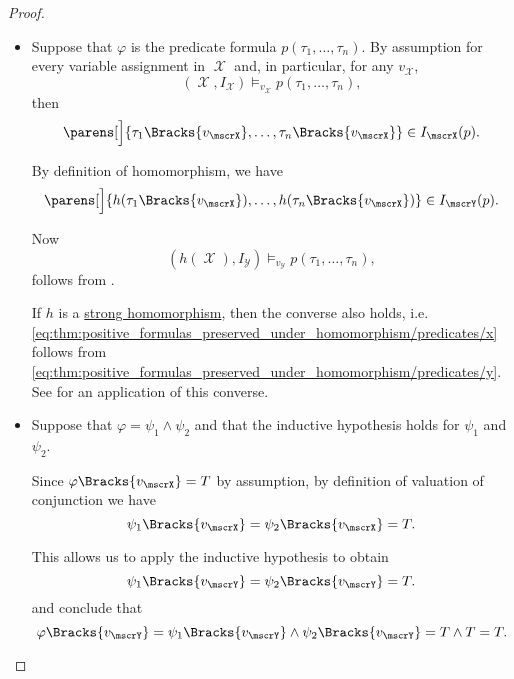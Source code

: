 \begin{proof}
\begin{itemize}
    \item Suppose that \( \varphi \) is the predicate formula \( p(\tau_1, \ldots, \tau_n) \). By assumption for every variable assignment in \( \mscrX \) and, in particular, for any \( v_\mscrX \),
    \begin{equation*}
      (\mscrX, I_\mscrX) \vDash_{v_\mscrX} p(\tau_1, \ldots, \tau_n),
    \end{equation*}
    then
    \begin{equation}\label{eq:thm:positive_formulas_preserved_under_homomorphism/predicates/x}
      \parens[\Big]{ \tau_1\Bracks{v_\mscrX}, \ldots, \tau_n\Bracks{v_\mscrX} } \in I_\mscrX(p).
    \end{equation}

    By definition of homomorphism, we have
    \begin{equation}\label{eq:thm:positive_formulas_preserved_under_homomorphism/predicates/y}
      \parens[\Big]{ h(\tau_1\Bracks{v_\mscrX}), \ldots, h(\tau_n\Bracks{v_\mscrX}) } \in I_\mscrY(p).
    \end{equation}

    Now
    \begin{equation*}
      (h(\mscrX), I_\mscrY) \vDash_{v_\mscrY} p(\tau_1, \ldots, \tau_n),
    \end{equation*}
    follows from .

    If \( h \) is a \hyperref[rem:first_order_strong_homomorphism]{strong homomorphism}, then the converse also holds, i.e. \eqref{eq:thm:positive_formulas_preserved_under_homomorphism/predicates/x} follows from \eqref{eq:thm:positive_formulas_preserved_under_homomorphism/predicates/y}. See  for an application of this converse.

    \item Suppose that \( \varphi = \psi_1 \wedge \psi_2 \) and that the inductive hypothesis holds for \( \psi_1 \) and \( \psi_2 \).

    Since \( \varphi\Bracks{v_\mscrX} = T \) by assumption, by definition of valuation of conjunction we have
    \begin{equation*}
      \psi_1\Bracks{v_\mscrX}
      =
      \psi_2\Bracks{v_\mscrX}
      =
      T.
    \end{equation*}

    This allows us to apply the inductive hypothesis to obtain
    \begin{equation*}
      \psi_1\Bracks{v_\mscrY}
      =
      \psi_2\Bracks{v_\mscrY}
      =
      T.
    \end{equation*}
    and conclude that
    \begin{equation*}
      \varphi\Bracks{v_\mscrY}
      =
      \psi_1\Bracks{v_\mscrY} \wedge \psi_2\Bracks{v_\mscrY}
      =
      T \wedge T
      =
      T.
    \end{equation*}


\end{itemize}
\end{proof}
